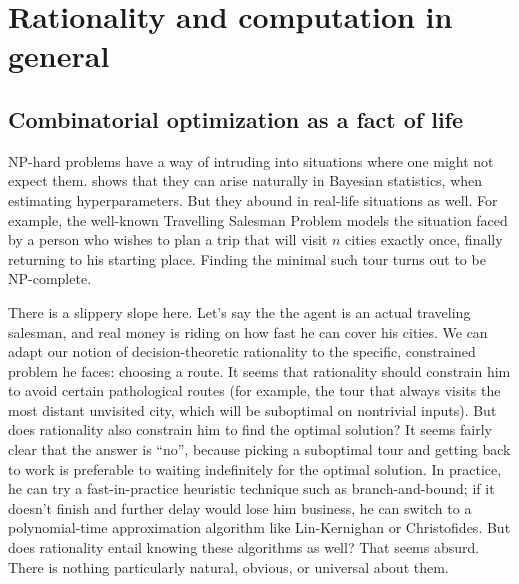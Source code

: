 \documentclass[letterpaper,12pt]{article}
\begin{document}

\section{Rationality and computation in general}
\subsection{Combinatorial optimization as a fact of life}
NP-hard problems have a way of intruding into situations where one might not expect them. \citet{robert2007choice} shows that they can arise naturally in Bayesian statistics, when estimating hyperparameters. But they abound in real-life situations as well. For example, the well-known Travelling Salesman Problem models the situation faced by a person who wishes to plan a trip that will visit $n$ cities exactly once, finally returning to his starting place. Finding the minimal such tour turns out to be NP-complete.

There is a slippery slope here. Let's say the the agent is an actual traveling salesman, and real money is riding on how fast he can cover his cities. We can adapt our notion of decision-theoretic rationality to the specific, constrained problem he faces: choosing a route. It seems that rationality should constrain him to avoid certain pathological routes (for example, the tour that always visits the most distant unvisited city, which will be suboptimal on nontrivial inputs). But does rationality also constrain him to find the optimal solution? It seems fairly clear that the answer is ``no'', because picking a suboptimal tour and getting back to work is preferable to waiting indefinitely for the optimal solution. In practice, he can try a fast-in-practice heuristic technique such as branch-and-bound; if it doesn't finish and further delay would lose him business, he can switch to a polynomial-time approximation algorithm like Lin-Kernighan or Christofides. But does rationality entail knowing these algorithms as well? That seems absurd. There is nothing particularly natural, obvious, or universal about them.
\end{document}
